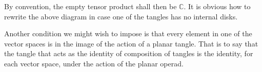 By convention, the empty tensor product shall then be $\mathbb{C}$. It is obvious how to rewrite the above diagram in case one of the tangles has no internal disks.

Another condition we might wish to impose is that every element in one of the vector spaces is in the image of the action of a planar tangle. That is to say that the tangle that acts as the identity of composition of tangles is the identity, for each vector space, under the action of the planar operad.

%
%
